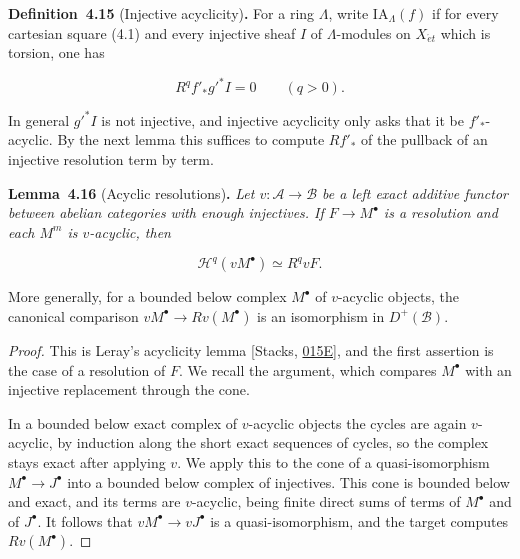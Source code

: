 \documentclass[11pt]{article}
\newenvironment{bpstatement}[2]{\par\addvspace{0.6\baselineskip}\noindent\textbf{#1}#2\textbf{.}\enspace\ignorespaces}
  {\par\addvspace{0.4\baselineskip}}
\newenvironment{bpstatementit}[2]{\begin{bpstatement}{#1}{#2}\itshape\ignorespaces}{\end{bpstatement}}
\begin{document}
\label{bp40}%
\begin{bpstatement}{Definition~4.15}{ (Injective acyclicity)}
For a ring \(\Lambda\), write \(\mathrm{IA}_{\Lambda}(f)\) if for every cartesian square (4.1) and every injective sheaf \(I\) of \(\Lambda\)-modules on \(X_{\acute{e}t}\) which is torsion, one has

\[
R^qf'_*g'^*I=0\qquad(q>0).
\]
\end{bpstatement}

\label{bp41}%
In general \(g'^*I\) is not injective, and injective acyclicity only asks that it be \(f'_*\)-acyclic. By the next lemma this suffices to compute \(Rf'_*\) of the pullback of an injective resolution term by term.

\label{bp42}%
\begin{bpstatementit}{Lemma~4.16}{ (Acyclic resolutions)}
Let \(v:\mathcal A\to\mathcal B\) be a left exact additive functor between abelian categories with enough injectives. If \(F\to M^\bullet\) is a resolution and each \(M^m\) is \(v\)-acyclic, then

\[
\mathcal H^q(vM^\bullet)\simeq R^qvF.
\]

More generally, for a bounded below complex \(M^\bullet\) of \(v\)-acyclic objects, the canonical comparison \(vM^\bullet\to Rv(M^\bullet)\) is an isomorphism in \(D^+(\mathcal B)\).
\end{bpstatementit}

\begin{proof}[{Proof}]\label{bp43}%
This is Leray's acyclicity lemma [Stacks, \href{https://stacks.math.columbia.edu/tag/015E}{015E}], and the first assertion is the case of a resolution of \(F\). We recall the argument, which compares \(M^\bullet\) with an injective replacement through the cone.

In a bounded below exact complex of \(v\)-acyclic objects the cycles are again \(v\)-acyclic, by induction along the short exact sequences of cycles, so the complex stays exact after applying \(v\). We apply this to the cone of a quasi-isomorphism \(M^\bullet\to J^\bullet\) into a bounded below complex of injectives. This cone is bounded below and exact, and its terms are \(v\)-acyclic, being finite direct sums of terms of \(M^\bullet\) and of \(J^\bullet\). It follows that \(vM^\bullet\to vJ^\bullet\) is a quasi-isomorphism, and the target computes \(Rv(M^\bullet)\).
\end{proof}
\end{document}
